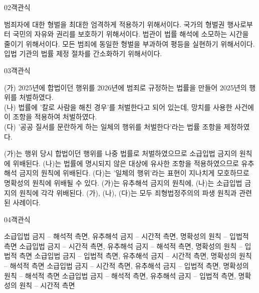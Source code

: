 \documentclass[fs85,seriesWit]{korfarm-base}
\begin{document}
\begin{kfQBlock}{02}{객관식}
\begin{kfChoices}
\kfChoice 범죄자에 대한 형벌을 최대한 엄격하게 적용하기 위해서이다.
\kfChoice 국가의 형벌권 행사로부터 국민의 자유와 권리를 보호하기 위해서이다.
\kfChoice 법관이 법률 해석에 소모하는 시간을 줄이기 위해서이다.
\kfChoice 모든 범죄에 동일한 형벌을 부과하여 평등을 실현하기 위해서이다.
\kfChoice 입법 기관의 법률 제정 절차를 간소화하기 위해서이다.
\end{kfChoices}
\end{kfQBlock}

\begin{kfQBlock}{03}{객관식}
\begin{kfEvidence}(가) 2025년에 합법이던 행위를 2026년에 범죄로 규정하는 법률을 만들어 2025년의 행위를 처벌하였다. \\\relax
(나) 법률에 '칼로 사람을 해친 경우'를 처벌한다고 되어 있는데, 망치를 사용한 사건에 이 조항을 적용하여 처벌하였다. \\\relax
(다) '공공 질서를 문란하게 하는 일체의 행위를 처벌한다'라는 법률 조항을 제정하였다.\end{kfEvidence}
\begin{kfChoices}
\kfChoice (가)는 행위 당시 합법이던 행위를 나중 법률로 처벌하였으므로 소급입법 금지의 원칙에 위배된다.
\kfChoice (나)는 법률에 명시되지 않은 대상에 유사한 조항을 적용하였으므로 유추해석 금지의 원칙에 위배된다.
\kfChoice (다)는 '일체의 행위'라는 표현이 지나치게 모호하므로 명확성의 원칙에 위배될 수 있다.
\kfChoice (가)는 유추해석 금지의 원칙에, (나)는 소급입법 금지의 원칙에 각각 위배된다.
\kfChoice (가), (나), (다)는 모두 죄형법정주의의 파생 원칙과 관련된 사례이다.
\end{kfChoices}
\end{kfQBlock}

\begin{kfQBlock}{04}{객관식}
\begin{kfChoices}
\kfChoice 소급입법 금지 -- 해석적 측면, 유추해석 금지 -- 시간적 측면, 명확성의 원칙 -- 입법적 측면
\kfChoice 소급입법 금지 -- 시간적 측면, 유추해석 금지 -- 해석적 측면, 명확성의 원칙 -- 입법적 측면
\kfChoice 소급입법 금지 -- 입법적 측면, 유추해석 금지 -- 시간적 측면, 명확성의 원칙 -- 해석적 측면
\kfChoice 소급입법 금지 -- 시간적 측면, 유추해석 금지 -- 입법적 측면, 명확성의 원칙 -- 해석적 측면
\kfChoice 소급입법 금지 -- 해석적 측면, 유추해석 금지 -- 입법적 측면, 명확성의 원칙 -- 시간적 측면
\end{kfChoices}
\end{kfQBlock}
\end{document}

